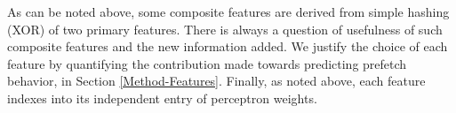 As can be noted above, some composite features are derived from simple
hashing (XOR) of two primary features. There is always a question of
usefulness of such composite features and the new information added.
We justify the choice of each feature by quantifying the contribution
made towards predicting prefetch behavior, in Section
\ref{Method-Features}.  Finally, as noted above, each feature indexes
into its independent entry of perceptron weights.

